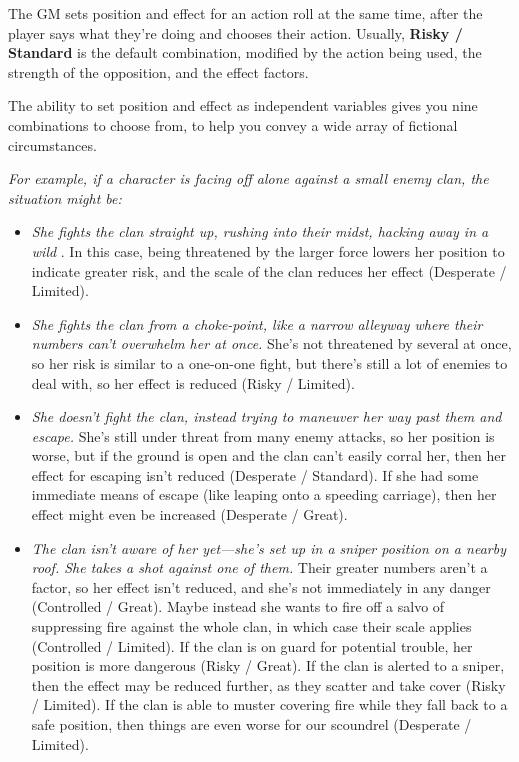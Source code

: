 The GM sets position and effect for an action roll at the same time, after the player says what they’re doing and chooses their action. Usually, \textbf{Risky / Standard} is the default combination, modified by the action being used, the strength of the opposition, and the effect factors.

The ability to set position and effect as independent variables gives you nine combinations to choose from, to help you convey a wide array of fictional circumstances.

\emph{For example, if a character is facing off alone against a small enemy clan, the situation might be:}

\begin{itemize}
\item \emph{She fights the clan straight up, rushing into their midst, hacking away in a wild} . In this case, being threatened by the larger force lowers her position to indicate greater risk, and the scale of the clan reduces her effect (Desperate / Limited).
\item \emph{She fights the clan from a choke-point, like a narrow alleyway where their numbers can’t overwhelm her at once.} She’s not threatened by several at once, so her risk is similar to a one-on-one fight, but there’s still a lot of enemies to deal with, so her effect is reduced (Risky / Limited).
\item \emph{She doesn’t fight the clan, instead trying to maneuver her way past them and escape.} She’s still under threat from many enemy attacks, so her position is worse, but if the ground is open and the clan can’t easily corral her, then her effect for escaping isn’t reduced (Desperate / Standard). If she had some immediate means of escape (like leaping onto a speeding carriage), then her effect might even be increased (Desperate / Great).
\item \emph{The clan isn’t aware of her yet—she’s set up in a sniper position on a nearby roof. She takes a shot against one of them.} Their greater numbers aren’t a factor, so her effect isn’t reduced, and she’s not immediately in any danger (Controlled / Great). Maybe instead she wants to fire off a salvo of suppressing fire against the whole clan, in which case their scale applies (Controlled / Limited). If the clan is on guard for potential trouble, her position is more dangerous (Risky / Great). If the clan is alerted to a sniper, then the effect may be reduced further, as they scatter and take cover (Risky / Limited). If the clan is able to muster covering fire while they fall back to a safe position, then things are even worse for our scoundrel (Desperate / Limited).
\end{itemize}

